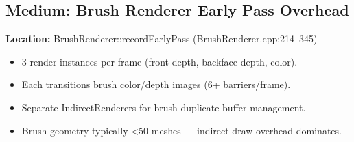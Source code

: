 \documentclass[11pt,a4paper]{article}
\begin{document}
\subsection{Medium: Brush Renderer Early Pass Overhead}
\textbf{Location:} BrushRenderer::recordEarlyPass (BrushRenderer.cpp:214–345)

\begin{itemize}
    \item 3 render instances per frame (front depth, backface depth, color).
    \item Each transitions brush color/depth images (6+ barriers/frame).
    \item Separate IndirectRenderers for brush duplicate buffer management.
    \item Brush geometry typically <50 meshes — indirect draw overhead dominates.
\end{itemize}
\end{document}
